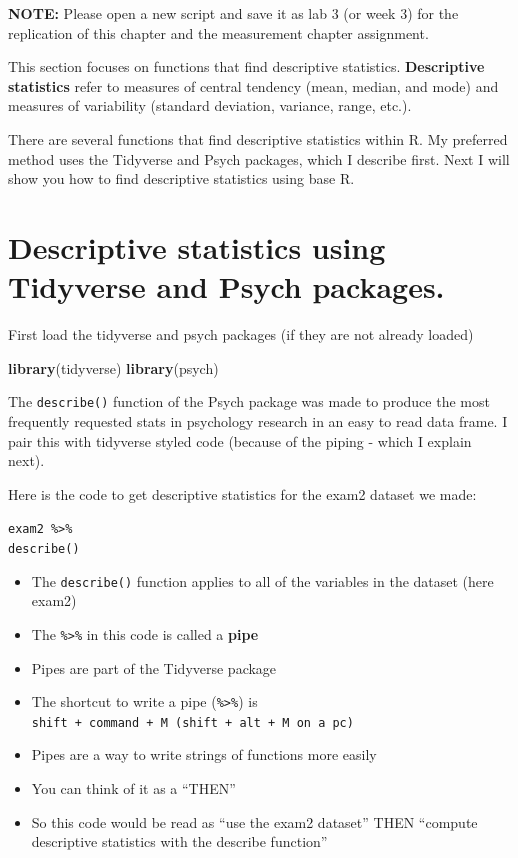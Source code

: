\documentclass[
]{book}
\newenvironment{Shaded}{\begin{snugshade}}{\end{snugshade}}
\newcommand{\KeywordTok}[1]{\textcolor[rgb]{0.13,0.29,0.53}{\textbf{#1}}}
\newcommand{\NormalTok}[1]{#1}
\providecommand{\tightlist}{%
  \setlength{\itemsep}{0pt}\setlength{\parskip}{0pt}}
\begin{document}
\textbf{NOTE:} Please open a new script and save it as lab 3 (or week 3) for the replication of this chapter and the measurement chapter assignment.

This section focuses on functions that find descriptive statistics. \textbf{Descriptive statistics} refer to measures of central tendency (mean, median, and mode) and measures of variability (standard deviation, variance, range, etc.).

There are several functions that find descriptive statistics within R. My preferred method uses the Tidyverse and Psych packages, which I describe first. Next I will show you how to find descriptive statistics using base R.

\hypertarget{descriptive-statistics-using-tidyverse-and-psych-packages.}{%
\section{Descriptive statistics using Tidyverse and Psych packages.}\label{descriptive-statistics-using-tidyverse-and-psych-packages.}}

First load the tidyverse and psych packages (if they are not already loaded)

\begin{Shaded}
\begin{Highlighting}[]
\KeywordTok{library}\NormalTok{(tidyverse)}
\KeywordTok{library}\NormalTok{(psych)}
\end{Highlighting}
\end{Shaded}

The \texttt{describe()} function of the Psych package was made to produce the most frequently requested stats in psychology research in an easy to read data frame. I pair this with tidyverse styled code (because of the piping - which I explain next).

Here is the code to get descriptive statistics for the exam2 dataset we made:

\texttt{exam2\ \%\textgreater{}\%}\\
\texttt{describe()}

\begin{itemize}
\tightlist
\item
  The \texttt{describe()} function applies to all of the variables in the dataset (here exam2)
\item
  The \texttt{\%\textgreater{}\%} in this code is called a \textbf{pipe}
\item
  Pipes are part of the Tidyverse package
\item
  The shortcut to write a pipe (\texttt{\%\textgreater{}\%}) is \texttt{shift\ +\ command\ +\ M\ (shift\ +\ alt\ +\ M\ on\ a\ pc)}
\item
  Pipes are a way to write strings of functions more easily
\item
  You can think of it as a ``THEN''
\item
  So this code would be read as ``use the exam2 dataset'' THEN ``compute descriptive statistics with the describe function''
\end{itemize}
\end{document}
